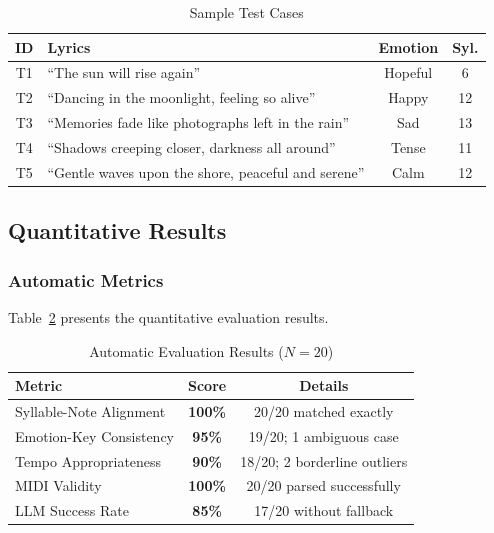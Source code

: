 \documentclass[conference]{IEEEtran}
\begin{document}
\begin{table}[htbp]
\caption{Sample Test Cases}
\label{tab:test_cases}
\centering
\begin{tabular}{@{}clcc@{}}
\toprule
\textbf{ID} & \textbf{Lyrics} & \textbf{Emotion} & \textbf{Syl.} \\
\midrule
T1 & ``The sun will rise again'' & Hopeful & 6 \\
T2 & ``Dancing in the moonlight, feeling so alive'' & Happy & 12 \\
T3 & ``Memories fade like photographs left in the rain'' & Sad & 13 \\
T4 & ``Shadows creeping closer, darkness all around'' & Tense & 11 \\
T5 & ``Gentle waves upon the shore, peaceful and serene'' & Calm & 12 \\
\bottomrule
\end{tabular}
\end{table}

\subsection{Quantitative Results}

\subsubsection{Automatic Metrics}

Table~\ref{tab:results} presents the quantitative evaluation results.

\begin{table}[htbp]
\caption{Automatic Evaluation Results ($N=20$)}
\label{tab:results}
\centering
\begin{tabular}{@{}lcc@{}}
\toprule
\textbf{Metric} & \textbf{Score} & \textbf{Details} \\
\midrule
Syllable-Note Alignment   & \textbf{100\%} & 20/20 matched exactly \\
Emotion-Key Consistency   & \textbf{95\%}  & 19/20; 1 ambiguous case \\
Tempo Appropriateness     & \textbf{90\%}  & 18/20; 2 borderline outliers \\
MIDI Validity             & \textbf{100\%} & 20/20 parsed successfully \\
LLM Success Rate          & \textbf{85\%}  & 17/20 without fallback \\
\bottomrule
\end{tabular}
\end{table}
\end{document}

